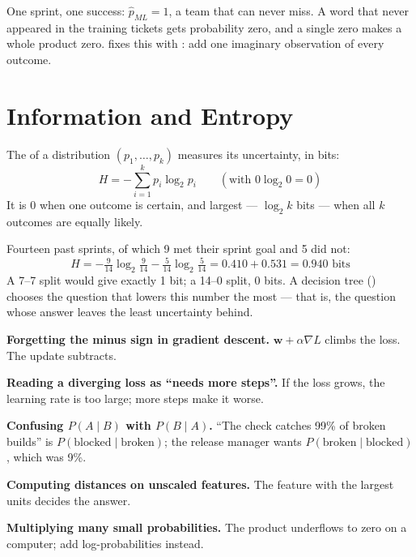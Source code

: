 \begin{alertbox}
One sprint, one success: $\hat{p}_{ML} = 1$, a team that can never miss. A word
that never appeared in the training tickets gets probability zero, and a single
zero makes a whole product zero.  fixes this with
: add one imaginary observation of every outcome.
\end{alertbox}

\section{Information and Entropy}

\begin{definitionbox}[Entropy]
The  of a distribution $(p_1, \dots, p_k)$ measures its uncertainty,
in bits:
\[
H = -\sum_{i=1}^{k} p_i \log_2 p_i \qquad (\text{with } 0 \log_2 0 = 0)
\]
It is 0 when one outcome is certain, and largest --- $\log_2 k$ bits --- when all
$k$ outcomes are equally likely.
\end{definitionbox}

\begin{worked}
Fourteen past sprints, of which 9 met their sprint goal and 5 did not:
\[
H = -\tfrac{9}{14}\log_2\tfrac{9}{14} - \tfrac{5}{14}\log_2\tfrac{5}{14}
  = 0.410 + 0.531 = \mathbf{0.940} \text{ bits}
\]
A 7--7 split would give exactly 1 bit; a 14--0 split, 0 bits. A decision tree
() chooses the question that lowers this number the most --- that
is, the question whose answer leaves the least uncertainty behind.
\end{worked}

\begin{pitfall}
\begin{tight}
  \item \textbf{Forgetting the minus sign in gradient descent.} $\mathbf{w} +
        \alpha\nabla L$ climbs the loss. The update subtracts.
  \item \textbf{Reading a diverging loss as ``needs more steps''.} If the loss
        grows, the learning rate is too large; more steps make it worse.
  \item \textbf{Confusing $P(A\mid B)$ with $P(B \mid A)$.} ``The check
        catches 99\% of broken builds'' is $P(\text{blocked}\mid\text{broken})$;
        the release manager wants $P(\text{broken}\mid\text{blocked})$, which was
        9\%.
  \item \textbf{Computing distances on unscaled features.} The feature with the
        largest units decides the answer.
  \item \textbf{Multiplying many small probabilities.} The product underflows
        to zero on a computer; add log-probabilities instead.
\end{tight}
\end{pitfall}

